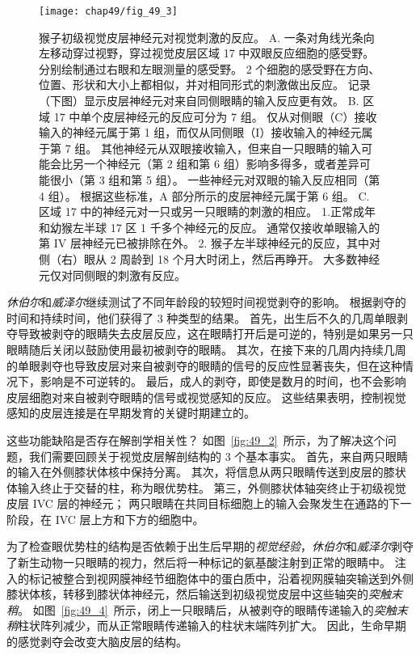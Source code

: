 \begin{figure}[htbp]
	\centering
	\texttt{[image: chap49/fig\_49\_3]}
	\caption{猴子初级视觉皮层神经元对视觉刺激的反应\cite{hubel1977ferrier}。
		A. 一条对角线光条向左移动穿过视野，穿过视觉皮层区域 17 中双眼反应细胞的感受野。
		分别绘制通过右眼和左眼测量的感受野。
		2 个细胞的感受野在方向、位置、形状和大小上都相似，并对相同形式的刺激做出反应。
		记录（下图）显示皮层神经元对来自同侧眼睛的输入反应更有效。
		B. 区域 17 中单个皮层神经元的反应可分为 7 组。
		仅从对侧眼（C）接收输入的神经元属于第 1 组，而仅从同侧眼（I）接收输入的神经元属于第 7 组。
		其他神经元从双眼接收输入，但来自一只眼睛的输入可能会比另一个神经元（第 2 组和第 6 组）影响多得多，或者差异可能很小（第 3 组和第 5 组）。
		一些神经元对双眼的输入反应相同（第 4 组）。
		根据这些标准，A 部分所示的皮层神经元属于第 6 组。
		C. 区域 17 中的神经元对一只或另一只眼睛的刺激的相应。
		1.正常成年和幼猴左半球 17 区 1 千多个神经元的反应。
		通常仅接收单眼输入的第 IV 层神经元已被排除在外。
		2. 猴子左半球神经元的反应，其中对侧（右）眼从 2 周龄到 18 个月大时闭上，然后再睁开。
		大多数神经元仅对同侧眼的刺激有反应。}
	\label{fig:49_3}
\end{figure}


\textit{休伯尔}和\textit{威泽尔}继续测试了不同年龄段的较短时间视觉剥夺的影响。
根据剥夺的时间和持续时间，他们获得了 3 种类型的结果。
首先，出生后不久的几周单眼剥夺导致被剥夺的眼睛失去皮层反应，这在眼睛打开后是可逆的，特别是如果另一只眼睛随后关闭以鼓励使用最初被剥夺的眼睛。
其次，在接下来的几周内持续几周的单眼剥夺也导致皮层对来自被剥夺的眼睛的信号的反应性显著丧失，但在这种情况下，影响是不可逆转的。
最后，成人的剥夺，即使是数月的时间，也不会影响皮层细胞对来自被剥夺眼睛的信号或视觉感知的反应。
这些结果表明，控制视觉感知的皮层连接是在早期发育的关键时期建立的。


这些功能缺陷是否存在解剖学相关性？
如图~\ref{fig:49_2}~所示，为了解决这个问题，我们需要回顾关于视觉皮层解剖结构的 3 个基本事实。
首先，来自两只眼睛的输入在外侧膝状体核中保持分离。
其次，将信息从两只眼睛传送到皮层的膝状体输入终止于交替的柱，称为眼优势柱。
第三，外侧膝状体轴突终止于初级视觉皮层 IVC 层的神经元；
两只眼睛在共同目标细胞上的输入会聚发生在通路的下一阶段，在 IVC 层上方和下方的细胞中。


为了检查眼优势柱的结构是否依赖于出生后早期的\textit{视觉经验}，\textit{休伯尔}和\textit{威泽尔}剥夺了新生动物一只眼睛的视力，然后将一种标记的氨基酸注射到正常的眼睛中。
注入的标记被整合到视网膜神经节细胞体中的蛋白质中，沿着视网膜轴突输送到外侧膝状体核，转移到膝状体神经元，然后输送到初级视觉皮层中这些轴突的\textit{突触末稍}。
如图~\ref{fig:49_4}~所示，闭上一只眼睛后，从被剥夺的眼睛传递输入的\textit{突触末稍}柱状阵列减少，而从正常眼睛传递输入的柱状末端阵列扩大。
因此，生命早期的感觉剥夺会改变大脑皮层的结构。



